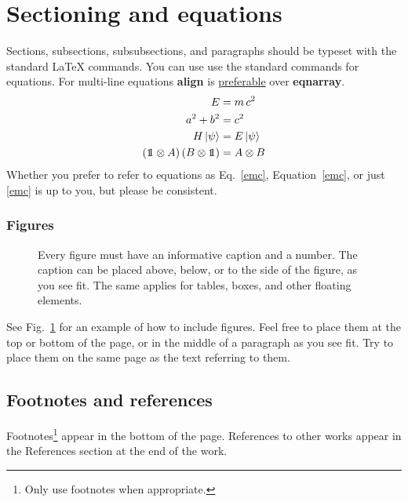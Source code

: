\documentclass[prx,a4paper,aps,twocolumn,superscriptaddress,11pt]{quantumarticle}
\begin{document}
\section{Sectioning and equations}
\label{sec:sec1}
Sections, subsections, subsubsections, and paragraphs should be typeset with the standard LaTeX commands.
You can use use the standard commands for equations.
For multi-line equations \textbf{align} is \href{http://tex.stackexchange.com/questions/196/eqnarray-vs-align}{preferable} over \textbf{eqnarray}.
\begin{align}
  \label{emc}
  E &= m\,c^2\\
  a^2 + b^2 &= c^2\\
  H\,|\psi\rangle &= E\,|\psi\rangle\\
  (\openone \otimes A)\,(B \otimes \openone) &= A \otimes B
\end{align}
Whether you prefer to refer to equations as Eq.~\eqref{emc}, Equation~\ref{emc}, or just \eqref{emc} is up to you, but please be consistent.

\subsubsection{Figures}
\begin{figure}[t]
  \centering
  \caption{Every figure must have an informative caption and a number.
    The caption can be placed above, below, or to the side of the figure, as you see fit.
    The same applies for tables, boxes, and other floating elements.}
  \label{fig:figure1}
\end{figure}

See Fig.~\ref{fig:figure1} for an example of how to include figures.
Feel free to place them at the top or bottom of the page, or in the middle of a paragraph as you see fit.
Try to place them on the same page as the text referring to them.

\subsection{Footnotes and references}
\label{sec:subsec1}
Footnotes\footnote{Only use footnotes when appropriate.} appear in the bottom of the page.
References to other works \cite{Foo2035} appear in the References section at the end of the work.
\end{document}
